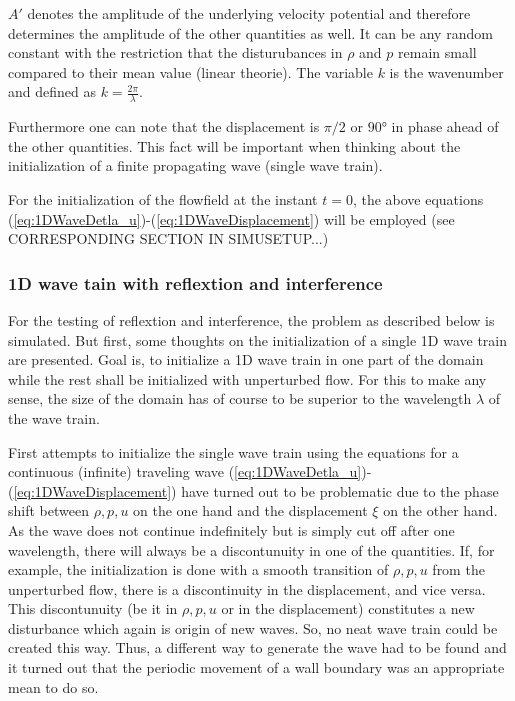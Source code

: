 \documentclass{report}
\begin{document}
$A\prime $ denotes the amplitude of the underlying velocity potential and therefore determines the amplitude of the other quantities as well. It can be any random constant with the restriction that the disturubances in $\rho$ and $p$ remain small compared to their mean value (linear theorie). The variable $k$ is the  wavenumber and defined as $k=\frac{2\pi}{\lambda}$.

Furthermore one can note that the displacement is $\pi/2$ or $90°$ in phase ahead of the other quantities. This fact will be important when thinking about the initialization of a finite propagating wave (single wave train). 

For the initialization of the flowfield at the instant $t=0$, the above equations (\ref{eq:1DWaveDetla_u})-(\ref{eq:1DWaveDisplacement}) will be employed (see CORRESPONDING SECTION IN SIMUSETUP...)


\subsubsection{1D wave tain with reflextion and interference}
For the testing of reflextion and interference, the problem as described below is simulated.
But first, some thoughts on the initialization of a single 1D wave train are presented.
Goal is, to initialize a 1D wave train in one part of the domain while the rest shall be initialized with unperturbed flow. For this to make any sense, the size of the domain has of course to be superior to the wavelength $\lambda$ of the wave train. 

First attempts to initialize the single wave train using the equations for a continuous (infinite) traveling wave (\ref{eq:1DWaveDetla_u})-(\ref{eq:1DWaveDisplacement}) have turned out to be problematic due to the phase shift between $\rho,p,u$ on the one hand and the displacement $\xi$ on the other hand. As the wave does not continue indefinitely but is simply cut off after one wavelength, there will always be a discontunuity in one of the quantities.  If, for example, the initialization is done with a smooth transition of $\rho,p,u$ from the unperturbed flow, there is a discontinuity in the displacement, and vice versa. This discontunuity (be it in $\rho,p,u$ or in the displacement) constitutes a new disturbance which again is origin of new waves. So, no neat wave train could be created this way. 
Thus, a different way to generate the wave had to be found and it turned out that the periodic movement of a wall boundary was an appropriate mean to do so. 
\end{document}
